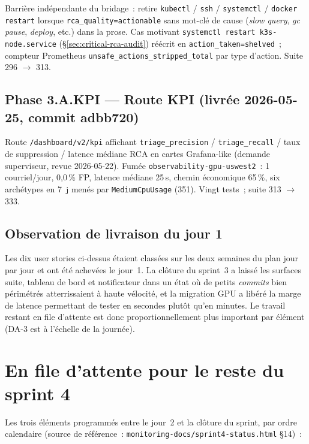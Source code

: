 \documentclass[11pt,a4paper,oneside]{report}
\begin{document}
Barrière indépendante du bridage~: retire \texttt{kubectl} /
\texttt{ssh} / \texttt{systemctl} / \texttt{docker restart}
lorsque \texttt{rca\_quality=actionable} sans mot-clé de cause
(\emph{slow query}, \emph{gc pause}, \emph{deploy}, etc.) dans la
prose. Cas motivant \texttt{systemctl restart k3s-node.service}
(\S\ref{sec:critical-rca-audit}) réécrit en
\texttt{action\_taken=shelved}~; compteur Prometheus
\texttt{unsafe\_actions\_stripped\_total} par type d'action.
Suite 296 $\to$ 313.

\subsection{Phase 3.A.KPI --- Route KPI (livrée 2026-05-25, commit adbb720)}

Route \texttt{/dashboard/v2/kpi} affichant
\texttt{triage\_precision} / \texttt{triage\_recall} / taux de
suppression / latence médiane RCA en cartes Grafana-like (demande
superviseur, revue 2026-05-22). Fumée \texttt{observability-gpu-uswest2}~:
1 courriel/jour, 0,0\,\% FP, latence médiane 25\,s, chemin
économique 65\,\%, six archétypes en 7~j
menés par \texttt{MediumCpuUsage} (351). Vingt tests~; suite
313 $\to$ 333.

\subsection{Observation de livraison du jour 1}

Les dix user stories ci-dessus étaient classées sur les deux
semaines du plan jour par jour et ont été achevées le jour~1. La
clôture du sprint~3 a laissé les surfaces suite, tableau de bord
et notificateur dans un état où de petits \emph{commits} bien
périmétrés atterrissaient à haute vélocité, et la migration GPU a
libéré la marge de latence permettant de tester en secondes plutôt
qu'en minutes. Le travail restant en file d'attente est donc
proportionnellement plus important par élément (DA-3 est à
l'échelle de la journée).

\section{En file d'attente pour le reste du sprint 4}

Les trois éléments programmés entre le jour~2 et la clôture du
sprint, par ordre calendaire (source de référence~:
\texttt{monitoring-docs/sprint4-status.html} \S14)~:
\end{document}
